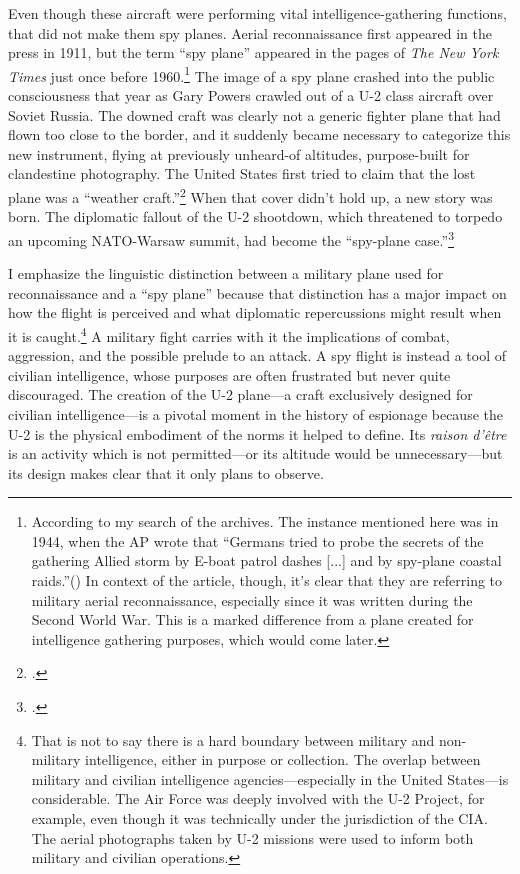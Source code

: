 \documentclass{report}
\begin{document}
\begin{refsegment}
Even though these aircraft were performing vital intelligence-gathering functions, that did not make them spy planes. Aerial reconnaissance first appeared in the press in 1911, but the term ``spy plane'' appeared in the pages of \emph{The New York Times} just once before 1960.\footnote{According to my search of the archives. The instance mentioned here was in 1944, when the AP wrote that ``Germans tried to probe the secrets of the gathering Allied storm by E-boat patrol dashes [...] and by spy-plane coastal raids.''(\cite{the_associated_press_britons_1944}) In context of the article, though, it's clear that they are referring to military aerial reconnaissance, especially since it was written during the Second World War. This is a marked difference from a plane created for intelligence gathering purposes, which would come later.} The image of a spy plane crashed into the public consciousness that year as Gary Powers crawled out of a U-2 class aircraft over Soviet Russia. The downed craft was clearly not a generic fighter plane that had flown too close to the border, and it suddenly became necessary to categorize this new instrument, flying at previously unheard-of altitudes, purpose-built for clandestine photography. The United States first tried to claim that the lost plane was a ``weather craft.''\footcite{caruthers_soviet_1960} When that cover didn't hold up, a new story was born. The diplomatic fallout of the U-2 shootdown, which threatened to torpedo an upcoming NATO-Warsaw summit, had become the ``spy-plane case.''\footcite[This is the second time that ``spy plane'' as a term of art appeared in \emph{The New York Times}. There would be many more.]{reston_allies_1960}

I emphasize the linguistic distinction between a military plane used for reconnaissance and a ``spy plane'' because that distinction has a major impact on how the flight is perceived and what diplomatic repercussions might result when it is caught.\footnote{That is not to say there is a hard boundary between military and non-military intelligence, either in purpose or collection. The overlap between military and civilian intelligence agencies---especially in the United States---is considerable. The Air Force was deeply involved with the U-2 Project, for example, even though it was technically under the jurisdiction of the CIA. The aerial photographs taken by U-2 missions were used to inform both military and civilian operations.} A military fight carries with it the implications of combat, aggression, and the possible prelude to an attack. A spy flight is instead a tool of civilian intelligence, whose purposes are often frustrated but never quite discouraged. The creation of the U-2 plane---a craft exclusively designed for civilian intelligence---is a pivotal moment in the history of espionage because the U-2 is the physical embodiment of the norms it helped to define. Its \emph{raison d'\^etre} is an activity which is not permitted---or its altitude would be unnecessary---but its design makes clear that it only plans to observe.


\end{refsegment}
\end{document}
